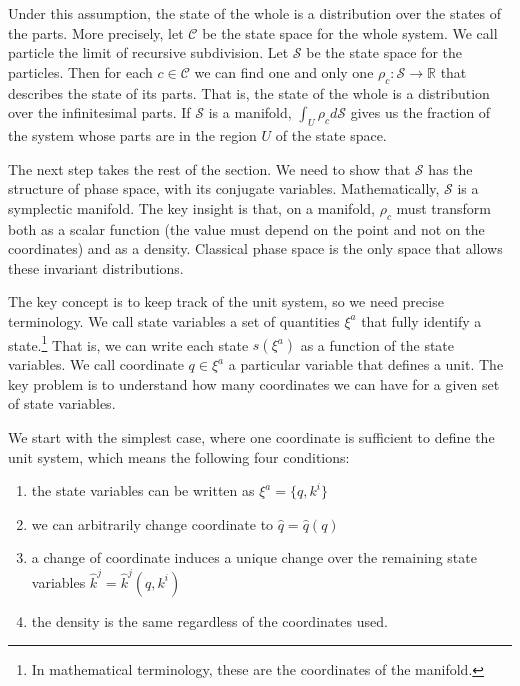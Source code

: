 \documentclass[11pt,letterpaper,fleqn]{memoir} %
\begin{document}
Under this assumption, the state of the whole is a distribution over the states of the parts. More precisely, let $\mathcal{C}$ be the state space for the whole system. We call particle the limit of recursive subdivision. Let $\mathcal{S}$ be the state space for the particles. Then for each $c \in \mathcal{C}$ we can find one and only one $\rho_c : \mathcal{S} \to \mathbb{R} $ that describes the state of its parts. That is, the state of the whole is a distribution over the infinitesimal parts. If $\mathcal{S}$ is a manifold, $\int_U \rho_c d\mathcal{S}$ gives us the fraction of the system whose parts are in the region $U$ of the state space.

The next step takes the rest of the section. We need to show that $\mathcal{S}$ has the structure of phase space, with its conjugate variables. Mathematically, $\mathcal{S}$ is a symplectic manifold. The key insight is that, on a manifold, $\rho_c$ must transform both as a scalar function (the value must depend on the point and not on the coordinates) and as a density. Classical phase space is the only space that allows these invariant distributions.

The key concept is to keep track of the unit system, so we need precise terminology. We call state variables a set of quantities $\xi^a$ that fully identify a state.\footnote{In mathematical terminology, these are the coordinates of the manifold.} That is, we can write each state $s(\xi^a)$ as a function of the state variables. We call coordinate $q \in \xi^a$ a particular variable that defines a unit. The key problem is to understand how many coordinates we can have for a given set of state variables.

We start with the simplest case, where one coordinate is sufficient to define the unit system, which means the following four conditions:
\begin{enumerate}[noitemsep]
	\item the state variables can be written as $\xi^a = \{ q, k^i \}$
	\item we can arbitrarily change coordinate to $\hat{q}=\hat{q}(q)$
	\item a change of coordinate induces a unique change over the remaining state variables $\hat{k}^j = \hat{k}^j(q, k^i)$
	\item the density is the same regardless of the coordinates used.
\end{enumerate}
\end{document}
